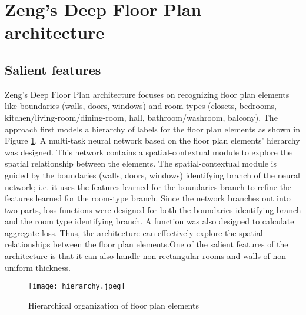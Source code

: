 \documentclass[a4paper]{article}
\begin{document}
\section{Zeng's Deep Floor Plan architecture}
\subsection{Salient features}
Zeng's Deep Floor Plan architecture focuses on recognizing floor plan elements like boundaries (walls, doors, windows) and room types (closets, bedrooms, kitchen/living-room/dining-room, hall, bathroom/washroom, balcony). The approach first models a hierarchy of labels for the floor plan elements as shown in Figure \ref{hierarchy}. A multi-task neural network based on the floor plan elements' hierarchy was designed. This network contains a spatial-contextual module to explore the spatial relationship between the elements. The spatial-contextual module is guided by the boundaries (walls, doors, windows) identifying branch of the neural network; i.e. it uses the features learned for the boundaries branch to refine the features learned for the room-type branch. Since the network branches out into two parts, loss functions were designed for both the boundaries identifying branch and the room type identifying branch. A function was also designed to calculate aggregate loss. Thus, the architecture can effectively explore the spatial relationships between the floor plan elements.One of the salient features of the architecture is that it can also handle non-rectangular rooms and walls of non-uniform thickness. 
\begin{figure}[H]
    \centering
    \texttt{[image: hierarchy.jpeg]}
    \caption{Hierarchical organization of floor plan elements}
    \label{hierarchy}
\end{figure}
\end{document}
